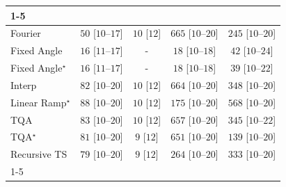 \begin{tabular}{l|cccc|}
\cline{1-5}
\multicolumn{5}{c}{\rule{0pt}{8pt}SV} \\
\midrule
Fourier & {\cellcolor[HTML]{EEF8EA}} \color[HTML]{000000} $50$ [$10$--$17$] & {\cellcolor[HTML]{F7FCF5}} \color[HTML]{000000} $10$ [$12$] & {\cellcolor[HTML]{00441B}} \color[HTML]{F1F1F1} $665$ [$10$--$20$] & {\cellcolor[HTML]{A5DB9F}} \color[HTML]{000000} $245$ [$10$--$20$] \\
Fixed Angle & {\cellcolor[HTML]{F6FCF4}} \color[HTML]{000000} $16$ [$11$--$17$] & {\cellcolor[HTML]{000000}} \color[HTML]{F1F1F1} {\cellcolor{white}} \color{black} - & {\cellcolor[HTML]{F5FBF3}} \color[HTML]{000000} $18$ [$10$--$18$] & {\cellcolor[HTML]{F0F9ED}} \color[HTML]{000000} $42$ [$10$--$24$] \\
Fixed Angle$^\star$ & {\cellcolor[HTML]{F6FCF4}} \color[HTML]{000000} $16$ [$11$--$17$] & {\cellcolor[HTML]{000000}} \color[HTML]{F1F1F1} {\cellcolor{white}} \color{black} - & {\cellcolor[HTML]{F5FBF3}} \color[HTML]{000000} $18$ [$10$--$18$] & {\cellcolor[HTML]{F1FAEE}} \color[HTML]{000000} $39$ [$10$--$22$] \\
Interp & {\cellcolor[HTML]{E7F6E3}} \color[HTML]{000000} $82$ [$10$--$20$] & {\cellcolor[HTML]{F7FCF5}} \color[HTML]{000000} $10$ [$12$] & {\cellcolor[HTML]{00441B}} \color[HTML]{F1F1F1} $664$ [$10$--$20$] & {\cellcolor[HTML]{6DC072}} \color[HTML]{000000} $348$ [$10$--$20$] \\
Linear Ramp$^\star$ & {\cellcolor[HTML]{E6F5E1}} \color[HTML]{000000} $88$ [$10$--$20$] & {\cellcolor[HTML]{F7FCF5}} \color[HTML]{000000} $10$ [$12$] & {\cellcolor[HTML]{C7E9C0}} \color[HTML]{000000} $175$ [$10$--$20$] & {\cellcolor[HTML]{067230}} \color[HTML]{F1F1F1} $568$ [$10$--$20$] \\
TQA & {\cellcolor[HTML]{E7F6E3}} \color[HTML]{000000} $83$ [$10$--$20$] & {\cellcolor[HTML]{F7FCF5}} \color[HTML]{000000} $10$ [$12$] & {\cellcolor[HTML]{00481D}} \color[HTML]{F1F1F1} $657$ [$10$--$20$] & {\cellcolor[HTML]{6EC173}} \color[HTML]{000000} $345$ [$10$--$22$] \\
TQA$^\star$ & {\cellcolor[HTML]{E7F6E3}} \color[HTML]{000000} $81$ [$10$--$20$] & {\cellcolor[HTML]{F7FCF5}} \color[HTML]{000000} $9$ [$12$] & {\cellcolor[HTML]{004A1E}} \color[HTML]{F1F1F1} $651$ [$10$--$20$] & {\cellcolor[HTML]{D4EECE}} \color[HTML]{000000} $139$ [$10$--$20$] \\
Recursive TS & {\cellcolor[HTML]{E8F6E3}} \color[HTML]{000000} $79$ [$10$--$20$] & {\cellcolor[HTML]{F7FCF5}} \color[HTML]{000000} $9$ [$12$] & {\cellcolor[HTML]{9CD797}} \color[HTML]{000000} $264$ [$10$--$20$] & {\cellcolor[HTML]{76C578}} \color[HTML]{000000} $333$ [$10$--$20$] \\
\cline{1-5}
\bottomrule
\end{tabular}
